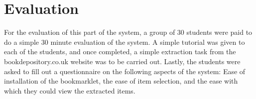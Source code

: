 \chapter{Evaluation}

For the evaluation of this part of the system, a group of 30 students were paid to do a simple 30 minute evaluation of the system. A simple tutorial was given to each of the students, and once completed, a simple extraction task from the bookdepository.co.uk website was to be carried out. Lastly, the students were asked to fill out a questionnaire on the following aspects of the system: Ease of installation of the bookmarklet, the ease of item selection, and the ease with which they could view the extracted items.